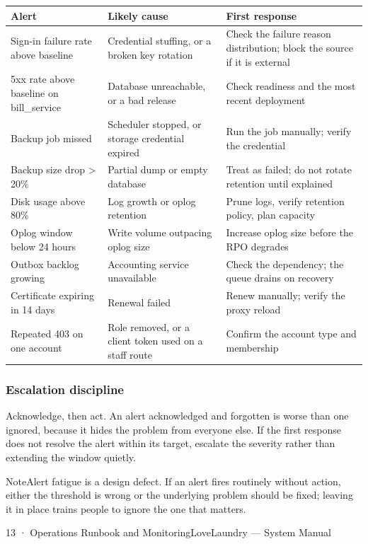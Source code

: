 \documentclass[11pt,a4paper,oneside]{book}
\begin{document}
\begin{center}\small
\begin{tabularx}{\linewidth}{|X|X|X|}
\hline
\rowcolor{lightgrey}
\textbf{Alert} & \textbf{Likely cause} & \textbf{First response} \\ \hline
Sign-in failure rate above baseline & Credential stuffing, or a broken key rotation & Check the failure reason distribution; block the source if it is external \\ \hline
5xx rate above baseline on bill\_service & Database unreachable, or a bad release & Check readiness and the most recent deployment \\ \hline
Backup job missed & Scheduler stopped, or storage credential expired & Run the job manually; verify the credential \\ \hline
Backup size drop > 20\% & Partial dump or empty database & Treat as failed; do not rotate retention until explained \\ \hline
Disk usage above 80\% & Log growth or oplog retention & Prune logs, verify retention policy, plan capacity \\ \hline
Oplog window below 24 hours & Write volume outpacing oplog size & Increase oplog size before the RPO degrades \\ \hline
Outbox backlog growing & Accounting service unavailable & Check the dependency; the queue drains on recovery \\ \hline
Certificate expiring in 14 days & Renewal failed & Renew manually; verify the proxy reload \\ \hline
Repeated 403 on one account & Role removed, or a client token used on a staff route & Confirm the account type and membership \\ \hline
\end{tabularx}
\end{center}
\subsubsection*{Escalation discipline}
Acknowledge, then act. An alert acknowledged and forgotten is worse than one ignored, because it hides the problem from everyone else. If the first response does not resolve the alert within its target, escalate the severity rather than extending the window quietly.

\begin{notebox}NoteAlert fatigue is a design defect. If an alert fires routinely without action, either the threshold is wrong or the underlying problem should be fixed; leaving it in place trains people to ignore the one that matters.\end{notebox}
13 · Operations Runbook and MonitoringLoveLaundry — System Manual
\end{document}
